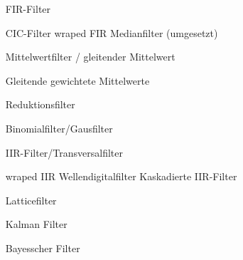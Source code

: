 \documentclass[a4paper,11pt]{article}
\begin{document}
\begin{itemize}
\item[FIR-Filter]

	\subitem CIC-Filter
	\subitem wraped FIR
	\subitem Medianfilter (umgesetzt)

	\subitem Mittelwertfilter / gleitender Mittelwert

	\subitem Gleitende gewichtete Mittelwerte

	\subitem Reduktionsfilter

	\subitem Binomialfilter/Gausfilter

\item[IIR-Filter/Transversalfilter]

	\subitem wraped IIR
	\subitem Wellendigitalfilter
	\subitem Kaskadierte IIR-Filter

\item[Latticefilter]


\item[Kalman Filter]

\item[Bayesscher Filter]

\end{itemize}
		
\end{document}
